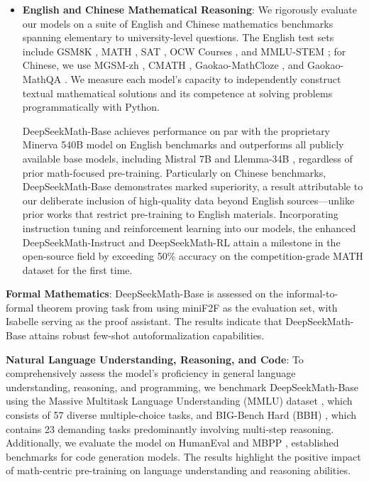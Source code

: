 \begin{itemize}[topsep=0pt]
    \item \textbf{English and Chinese Mathematical Reasoning}: We rigorously evaluate our models on a suite of English and Chinese mathematics benchmarks spanning elementary to university-level questions. The English test sets include GSM8K \citep{gsm8k}, MATH \citep{MATH}, SAT \citep{llemma}, OCW Courses \citep{minerva}, and MMLU-STEM \citep{mmlu}; for Chinese, we use MGSM-zh \citep{mgsm}, CMATH \citep{wei2023cmath}, Gaokao-MathCloze \citep{agieval}, and Gaokao-MathQA \citep{agieval}. We measure each model's capacity to independently construct textual mathematical solutions and its competence at solving problems programmatically with Python.

    DeepSeekMath-Base achieves performance on par with the proprietary Minerva 540B \citep{minerva} model on English benchmarks and outperforms all publicly available base models, including Mistral 7B \citep{mistral} and Llemma-34B \citep{llemma}, regardless of prior math-focused pre-training. Particularly on Chinese benchmarks, DeepSeekMath-Base demonstrates marked superiority, a result attributable to our deliberate inclusion of high-quality data beyond English sources—unlike prior works \citep{minerva,llemma} that restrict pre-training to English materials. Incorporating instruction tuning and reinforcement learning into our models, the enhanced DeepSeekMath-Instruct and DeepSeekMath-RL attain a milestone in the open-source field by exceeding 50\% accuracy on the competition-grade MATH dataset for the first time.
\end{itemize}

\item \textbf{Formal Mathematics}: DeepSeekMath-Base is assessed on the informal-to-formal theorem proving task from \citep{dsp_proof} using miniF2F \citep{minif2f} as the evaluation set, with Isabelle \citep{isabelle} serving as the proof assistant. The results indicate that DeepSeekMath-Base attains robust few-shot autoformalization capabilities.

\item \textbf{Natural Language Understanding, Reasoning, and Code}: To comprehensively assess the model’s proficiency in general language understanding, reasoning, and programming, we benchmark DeepSeekMath-Base using the Massive Multitask Language Understanding (MMLU) dataset \citep{mmlu}, which consists of 57 diverse multiple-choice tasks, and BIG-Bench Hard (BBH) \citep{bbh}, which contains 23 demanding tasks predominantly involving multi-step reasoning. Additionally, we evaluate the model on HumanEval \citep{codex} and MBPP \citep{mbpp}, established benchmarks for code generation models. The results highlight the positive impact of math-centric pre-training on language understanding and reasoning abilities.

